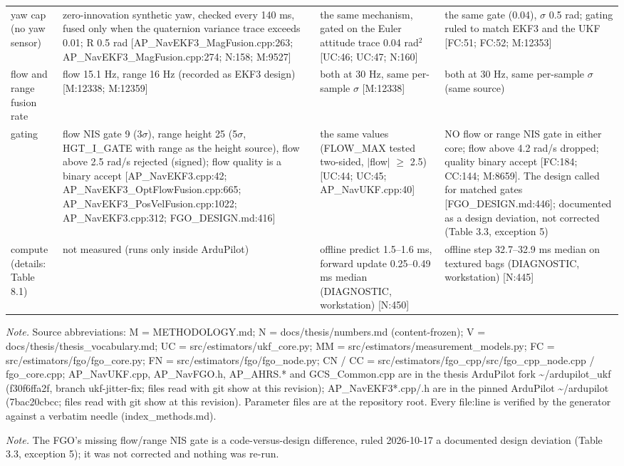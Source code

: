\begin{table}[htbp]
\begin{tabular}{p{}p{}p{}p{}}
yaw cap (no yaw sensor) & zero-innovation synthetic yaw, checked every 140 ms, fused only when the quaternion variance trace exceeds 0.01; R 0.5 rad [AP\_NavEKF3\_MagFusion.cpp:263; AP\_NavEKF3\_MagFusion.cpp:274; N:158; M:9527] & the same mechanism, gated on the Euler attitude trace 0.04 rad$^2$ [UC:46; UC:47; N:160] & the same gate (0.04), $\sigma$ 0.5 rad; gating ruled to match EKF3 and the UKF [FC:51; FC:52; M:12353] \\
flow and range fusion rate & flow 15.1 Hz, range 16 Hz (recorded as EKF3 design) [M:12338; M:12359] & both at 30 Hz, same per-sample $\sigma$ [M:12338] & both at 30 Hz, same per-sample $\sigma$ (same source) \\
gating & flow NIS gate 9 (3$\sigma$), range height 25 (5$\sigma$, HGT\_I\_GATE with range as the height source), flow above 2.5 rad/s rejected (signed); flow quality is a binary accept [AP\_NavEKF3.cpp:42; AP\_NavEKF3\_OptFlowFusion.cpp:665; AP\_NavEKF3\_PosVelFusion.cpp:1022; AP\_NavEKF3.cpp:312; FGO\_DESIGN.md:416] & the same values (FLOW\_MAX tested two-sided, $|$flow$|$ $\ge$ 2.5) [UC:44; UC:45; AP\_NavUKF.cpp:40] & NO flow or range NIS gate in either core; flow above 4.2 rad/s dropped; quality binary accept [FC:184; CC:144; M:8659]. The design called for matched gates [FGO\_DESIGN.md:446]; documented as a design deviation, not corrected (Table 3.3, exception 5) \\
compute (details: Table 8.1) & not measured (runs only inside ArduPilot) & offline predict 1.5--1.6 ms, forward update 0.25--0.49 ms median (DIAGNOSTIC, workstation) [N:450] & offline step 32.7--32.9 ms median on textured bags (DIAGNOSTIC, workstation) [N:445] \\
\bottomrule
\end{tabular}
\par\smallskip\raggedright
\textit{Note.} Source abbreviations: M = METHODOLOGY.md; N = docs/thesis/numbers.md (content-frozen); V = docs/thesis/thesis\_vocabulary.md; UC = src/estimators/ukf\_core.py; MM = src/estimators/measurement\_models.py; FC = src/estimators/fgo/fgo\_core.py; FN = src/estimators/fgo/fgo\_node.py; CN / CC = src/estimators/fgo\_cpp/src/fgo\_cpp\_node.cpp / fgo\_core.cpp; AP\_NavUKF.cpp, AP\_NavFGO.h, AP\_AHRS.* and GCS\_Common.cpp are in the thesis ArduPilot fork \textasciitilde{}/ardupilot\_ukf (f30f6ffa2f, branch ukf-jitter-fix; files read with git show at this revision); AP\_NavEKF3*.cpp/.h are in the pinned ArduPilot \textasciitilde{}/ardupilot (7bac20cbcc; files read with git show at this revision). Parameter files are at the repository root. Every file:line is verified by the generator against a verbatim needle (index\_methods.md).\par
\textit{Note.} The FGO's missing flow/range NIS gate is a code-versus-design difference, ruled 2026-10-17 a documented design deviation (Table 3.3, exception 5); it was not corrected and nothing was re-run.\par
\end{table}
